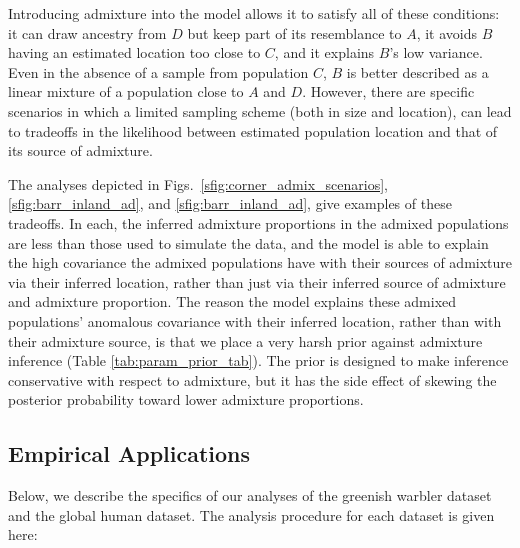 \documentclass[10pt,letterpaper]{article}
\begin{document}
Introducing admixture into the model allows it to satisfy all of these conditions: it can draw ancestry from $D$ but keep part of its resemblance to $A$, it avoids $B$ having an estimated location too close to $C$, and it explains $B$'s low variance.  Even in the absence of a sample from population $C$, $B$ is better described as a linear mixture of a population close to $A$ and $D$.  However, there are specific scenarios in which a limited sampling scheme (both in size and location), can lead to tradeoffs in the likelihood between estimated population location and that of its source of admixture.

The analyses depicted in Figs.\ \ref{sfig:corner_admix_scenarios}, 
\ref{sfig:barr_inland_ad}, and
\ref{sfig:barr_inland_ad}, 
give examples of these tradeoffs.
In each, the inferred admixture proportions in the admixed populations are less than those used to simulate the data,
and the model is able to explain the high covariance the admixed populations have with their sources of admixture via their inferred location,
rather than just via their inferred source of admixture and admixture proportion.  
The reason the model explains these admixed populations' anomalous covariance with their inferred location,
rather than with their admixture source,
is that we place a very harsh prior against admixture inference (Table \ref{tab:param_prior_tab}).
The prior is designed to make inference conservative with respect to admixture,
but it has the side effect of skewing the posterior probability toward lower admixture proportions.

\subsection*{Empirical Applications}
Below, we describe the specifics of our analyses of the greenish warbler dataset and the global human dataset.  The analysis procedure for each dataset is given here:
\end{document}
